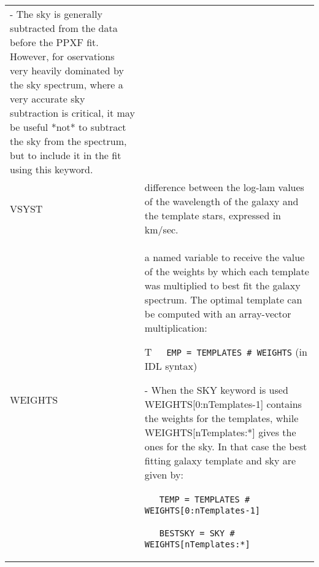 \begin{center}
\begin{longtable}{p{2.7cm}| p{11.1cm}}
      \smallskip

     - The sky is generally subtracted from the data before the PPXF fit. However,
       for oservations very heavily dominated by the sky spectrum, where a very
       accurate sky subtraction is critical, it may be useful *not* to subtract
       the sky from the spectrum, but to include it in the fit using this keyword.\\
%
   VSYST  & difference between the log-lam values of the wavelength of the galaxy and the template stars, expressed in km/sec.\\
%
   WEIGHTS & a named variable to receive the value of the weights by which each
       template was multiplied to best fit the galaxy spectrum. The optimal
       template can be computed with an array-vector multiplication:
    \smallskip

           T\ \ \    {\tt EMP = TEMPLATES \# WEIGHTS} (in IDL syntax)
    \smallskip

       - When the SKY keyword is used WEIGHTS[0:nTemplates-1] contains the weights
       for the templates, while WEIGHTS[nTemplates:*] gives the ones for the sky.
       In that case the best fitting galaxy template and sky are given by:
    \smallskip

          \ \ \    {\tt TEMP = TEMPLATES \# WEIGHTS[0:nTemplates-1]}

          \ \ \    {\tt BESTSKY = SKY \# WEIGHTS[nTemplates:*]}
    \smallskip


\end{longtable}
\end{center}
